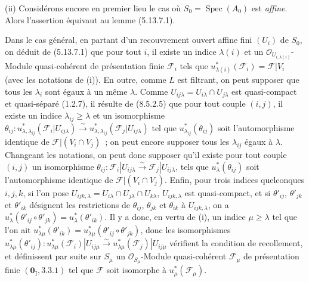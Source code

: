 \par\medskip\noindent\textup{(ii)} Considérons encore en premier lieu le cas où
$S_0=\operatorname{Spec}(A_0)$ est
\emph{affine}. Alors l'assertion équivaut au lemme (5.13.7.1).

Dans le cas général, en partant d'un recouvrement ouvert affine fini $(U_i)$
de $S_0$, on déduit de (5.13.7.1) que pour tout $i$, il existe un indice
$\lambda(i)$ et un $\mathcal O_{U_{i,\lambda(i)}}$-Module quasi-cohérent de
présentation finie $\mathcal F_i$ tels que
$u_{\lambda(i)}^*(\mathcal F_i)=\mathcal F|V_i$ (avec les notations de (i)). En
outre, comme $L$ est filtrant, on peut supposer que tous les $\lambda_i$ sont
égaux à un même $\lambda$. Comme
$U_{ij\lambda}=U_{i\lambda}\cap U_{j\lambda}$ est quasi-compact et
quasi-séparé (1.2.7), il résulte de (8.5.2.5) que pour tout couple $(i,j)$, il
existe un indice $\lambda_{ij}\geq\lambda$ et un isomorphisme
$\theta_{ij}:u_{\lambda,\lambda_{ij}}^*(\mathcal F_i|U_{ij\lambda})
  \xrightarrow{\sim}
  u_{\lambda,\lambda_{ij}}^*(\mathcal F_j|U_{ij\lambda})$
tel que $u_{\lambda_{ij}}^*(\theta_{ij})$ soit l'automorphisme identique de
$\mathcal F|(V_i\cap V_j)$~; on peut encore supposer tous les
$\lambda_{ij}$ égaux à $\lambda$. Changeant les notations, on peut donc
supposer qu'il existe pour tout couple $(i,j)$ un isomorphisme
$\theta_{ij}:\mathcal F_i|U_{ij\lambda}
  \xrightarrow{\sim}\mathcal F_j|U_{ij\lambda}$,
tels que $u_\lambda^*(\theta_{ij})$ soit l'automorphisme identique de
$\mathcal F|(V_i\cap V_j)$. Enfin, pour trois indices quelconques $i,j,k$, si
l'on pose
$U_{ijk,\lambda}=U_{i\lambda}\cap U_{j\lambda}\cap U_{k\lambda}$,
$U_{ijk,\lambda}$ est quasi-compact, et si $\theta'_{ij}$, $\theta'_{jk}$ et
$\theta'_{ik}$ désignent les restrictions de $\theta_{ij}$, $\theta_{jk}$ et
$\theta_{ik}$ à $U_{ijk,\lambda}$, on a
$u_\lambda^*(\theta'_{ij}\circ\theta'_{jk})=u_\lambda^*(\theta'_{ik})$.
Il y a donc, en vertu de (i), un indice $\mu\geq\lambda$ tel que l'on ait
$u_{\lambda\mu}^*(\theta'_{ik})
  =u_{\lambda\mu}^*(\theta'_{ij}\circ\theta'_{jk})$,
donc les isomorphismes
$u_{\lambda\mu}^*(\theta'_{ij}):
  u_{\lambda\mu}^*(\mathcal F_i)|U_{ij\mu}
  \xrightarrow{\sim}
  u_{\lambda\mu}^*(\mathcal F_j)|U_{ij\mu}$
vérifient la condition de recollement, et définissent par suite sur $S_\mu$ un
$\mathcal O_{S_\mu}$-Module quasi-cohérent $\mathcal F_\mu$ de présentation
finie $(\mathbf{0}_{\mathrm I},3.3.1)$ tel que $\mathcal F$ soit isomorphe à
$u_\mu^*(\mathcal F_\mu)$.

